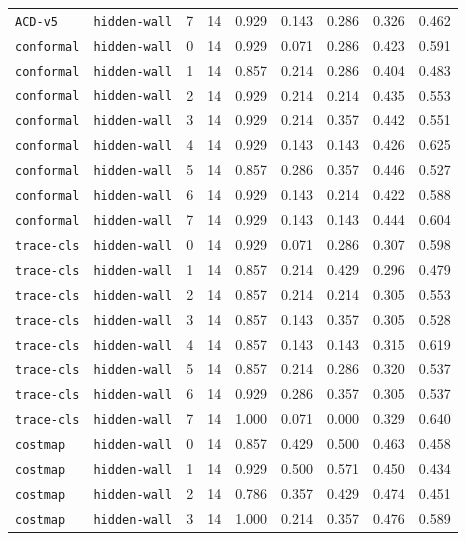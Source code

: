 \documentclass{article}
\begin{document}
\begin{center}
{\begin{tabular}{llllccccc}
\texttt{ACD-v5} & \texttt{hidden-wall} & 7 & 14 & 0.929 & 0.143 & 0.286 & 0.326 & 0.462 \\
\texttt{conformal} & \texttt{hidden-wall} & 0 & 14 & 0.929 & 0.071 & 0.286 & 0.423 & 0.591 \\
\texttt{conformal} & \texttt{hidden-wall} & 1 & 14 & 0.857 & 0.214 & 0.286 & 0.404 & 0.483 \\
\texttt{conformal} & \texttt{hidden-wall} & 2 & 14 & 0.929 & 0.214 & 0.214 & 0.435 & 0.553 \\
\texttt{conformal} & \texttt{hidden-wall} & 3 & 14 & 0.929 & 0.214 & 0.357 & 0.442 & 0.551 \\
\texttt{conformal} & \texttt{hidden-wall} & 4 & 14 & 0.929 & 0.143 & 0.143 & 0.426 & 0.625 \\
\texttt{conformal} & \texttt{hidden-wall} & 5 & 14 & 0.857 & 0.286 & 0.357 & 0.446 & 0.527 \\
\texttt{conformal} & \texttt{hidden-wall} & 6 & 14 & 0.929 & 0.143 & 0.214 & 0.422 & 0.588 \\
\texttt{conformal} & \texttt{hidden-wall} & 7 & 14 & 0.929 & 0.143 & 0.143 & 0.444 & 0.604 \\
\texttt{trace-cls} & \texttt{hidden-wall} & 0 & 14 & 0.929 & 0.071 & 0.286 & 0.307 & 0.598 \\
\texttt{trace-cls} & \texttt{hidden-wall} & 1 & 14 & 0.857 & 0.214 & 0.429 & 0.296 & 0.479 \\
\texttt{trace-cls} & \texttt{hidden-wall} & 2 & 14 & 0.857 & 0.214 & 0.214 & 0.305 & 0.553 \\
\texttt{trace-cls} & \texttt{hidden-wall} & 3 & 14 & 0.857 & 0.143 & 0.357 & 0.305 & 0.528 \\
\texttt{trace-cls} & \texttt{hidden-wall} & 4 & 14 & 0.857 & 0.143 & 0.143 & 0.315 & 0.619 \\
\texttt{trace-cls} & \texttt{hidden-wall} & 5 & 14 & 0.857 & 0.214 & 0.286 & 0.320 & 0.537 \\
\texttt{trace-cls} & \texttt{hidden-wall} & 6 & 14 & 0.929 & 0.286 & 0.357 & 0.305 & 0.537 \\
\texttt{trace-cls} & \texttt{hidden-wall} & 7 & 14 & 1.000 & 0.071 & 0.000 & 0.329 & 0.640 \\
\texttt{costmap} & \texttt{hidden-wall} & 0 & 14 & 0.857 & 0.429 & 0.500 & 0.463 & 0.458 \\
\texttt{costmap} & \texttt{hidden-wall} & 1 & 14 & 0.929 & 0.500 & 0.571 & 0.450 & 0.434 \\
\texttt{costmap} & \texttt{hidden-wall} & 2 & 14 & 0.786 & 0.357 & 0.429 & 0.474 & 0.451 \\
\texttt{costmap} & \texttt{hidden-wall} & 3 & 14 & 1.000 & 0.214 & 0.357 & 0.476 & 0.589 \\
\bottomrule
\end{tabular}%
}
\end{center}
\end{document}
